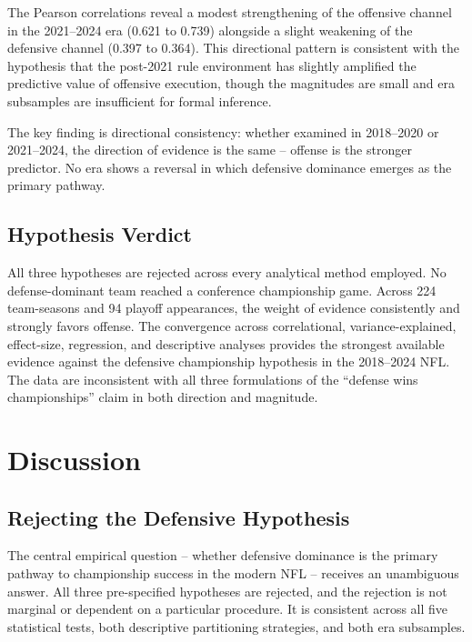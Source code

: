 \documentclass[12pt,a4paper]{article}
\begin{document}
The Pearson correlations reveal a modest strengthening of the offensive channel in the 2021--2024 era (0.621 to 0.739) alongside a slight weakening of the defensive channel (0.397 to 0.364). This directional pattern is consistent with the hypothesis that the post-2021 rule environment has slightly amplified the predictive value of offensive execution, though the magnitudes are small and era subsamples are insufficient for formal inference.

The key finding is directional consistency: whether examined in 2018--2020 or 2021--2024, the direction of evidence is the same -- offense is the stronger predictor. No era shows a reversal in which defensive dominance emerges as the primary pathway.

\subsection{Hypothesis Verdict}

All three hypotheses are rejected across every analytical method employed. No defense-dominant team reached a conference championship game. Across 224 team-seasons and 94 playoff appearances, the weight of evidence consistently and strongly favors offense. The convergence across correlational, variance-explained, effect-size, regression, and descriptive analyses provides the strongest available evidence against the defensive championship hypothesis in the 2018--2024 NFL. The data are inconsistent with all three formulations of the ``defense wins championships'' claim in both direction and magnitude.

\section{Discussion}
\label{sec:discussion}

\subsection{Rejecting the Defensive Hypothesis}
\label{sec:rejecting}

The central empirical question -- whether defensive dominance is the primary pathway to championship success in the modern NFL -- receives an unambiguous answer. All three pre-specified hypotheses are rejected, and the rejection is not marginal or dependent on a particular procedure. It is consistent across all five statistical tests, both descriptive partitioning strategies, and both era subsamples.
\end{document}

